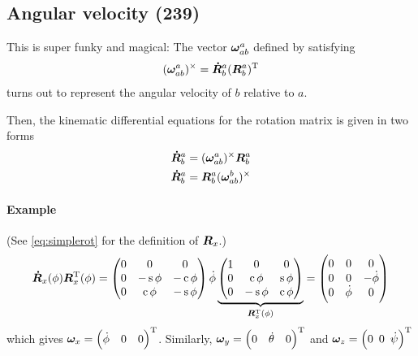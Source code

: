 \documentclass[a4paper, 12pt]{article}
\begin{document}
\subsection{Angular velocity (239)}
This is super funky and magical: The vector \( \boldsymbol{\omega}^a_{ab} \) defined by satisfying
\begin{equation}
	( \boldsymbol{\omega}^a_{ab} )^\times =
	\bm{\dot{R}}^a_b ( \bm{R}^a_b )^{\text{T}}
\end{equation}
turns out to represent the angular velocity of \( b \) relative to \( a \).

Then, the kinematic differential equations for the rotation matrix is given in two forms
\begin{equation}
	\begin{aligned}
		\bm{\dot{R}}^a_b &= (\boldsymbol{\omega}^a_{ab})^\times \bm{R}^a_b \\
		\bm{\dot{R}}^a_b &= \bm{R}^a_b (\boldsymbol{\omega}^b_{ab})^\times
	\end{aligned}
\end{equation}

\paragraph{Example} (See \eqref{eq:simplerot} for the definition of \( \bm{R}_x \).)
\begin{equation}
	\bm{\dot{R}}_x(\phi) \bm{R}_x^{\text{T}}(\phi) =
	\begin{pmatrix}
		0 & 0       & 0       \\
		0 & -\operatorname{s}\phi & -\operatorname{c}\phi \\
		0 &  \operatorname{c}\phi & -\operatorname{s}\phi \\
	\end{pmatrix}
	\dot{\phi}
	\underbrace{
		\begin{pmatrix}
			1 &  0      & 0      \\
			0 &  \operatorname{c}\phi & \operatorname{s}\phi \\
			0 & -\operatorname{s}\phi & \operatorname{c}\phi \\
		\end{pmatrix}
	}_{\bm{R}_x^{\text{T}}(\phi)}
	=
	\begin{pmatrix}
		0 & 0          & 0           \\
		0 & 0          & -\dot{\phi} \\
		0 & \dot{\phi} & 0           \\
	\end{pmatrix}
\end{equation}
which gives \( \boldsymbol{\omega}_x = \begin{pmatrix} \dot{\phi} & 0 & 0 \end{pmatrix}^{\text{T}} \).
Similarly, \( \boldsymbol{\omega}_y = \begin{pmatrix} 0 & \dot{\theta} & 0 \end{pmatrix}^{\text{T}} \)
and \( \boldsymbol{\omega}_z = \left( 0 \enskip 0 \enskip \dot{\psi} \right) ^{\text{T}} \)
\end{document}

